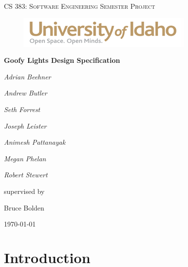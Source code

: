 \documentclass[12pt]{article}
\begin{document}
	\begin{titlepage}
		\centering	
		\vspace{1cm}
  
		{\scshape\Large CS 383: Software Engineering Semester Project\par}
    \begin{figure}[h]
      \centering
      \includegraphics[width=0.7\linewidth]{uislogan}
    \end{figure}   
		\vspace{2.5cm}
    
		{\huge\bfseries Goofy Lights Design Specification\par}
		\vspace{2cm}	
    
		{ 		
  		{\Large\itshape Adrian Beehner\par}
  		{\Large\itshape Andrew Butler\par}
  		{\Large\itshape Seth Forrest\par}
  		{\Large\itshape Joseph Leister\par}
  		{\Large\itshape Animesh Pattanayak\par}
  		{\Large\itshape Megan Phelan\par}
  		{\Large\itshape Robert Stewert\par}		
		}		
    \vspace{1.5cm}	
    
		supervised by\par
		Bruce Bolden		
		\vfill		
		{\large \today\par}
	\end{titlepage}

	\tableofcontents
	\newpage
	
	\section{Introduction}
\end{document}
